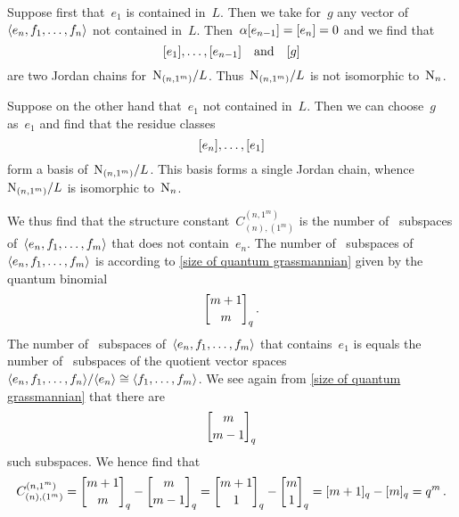 \documentclass[a4paper,11pt]{scrartcl}
\begin{document}
Suppose first that~$e_1$ is contained in~$L$.
Then we take for~$g$ any vector of~$\langle e_n, f_1, \dotsc, f_n\rangle$ not contained in~$L$.
Then~$\alpha [e_{n-1}] = [e_n] = 0$ and we find that
\[
  [e_1], \dotsc, [e_{n-1}]
  \quad
  \text{and}
  \quad
  [g]
\]
are two Jordan chains for~$\mathrm{N}_{(n, 1^m)} / L$.
Thus~$\mathrm{N}_{(n, 1^m)} / L$ is not isomorphic to~$\mathrm{N}_n$.

Suppose on the other hand that~$e_1$ not contained in~$L$.
Then we can choose~$g$ as~$e_1$ and find that the residue classes
\[
  [e_n], \dotsc, [e_1]
\]
form a basis of~$\mathrm{N}_{(n, 1^m)} / L$.
This basis forms a single Jordan chain, whence~$\mathrm{N}_{(n, 1^m)} / L$ is isomorphic to~$\mathrm{N}_n$.

We thus find that the structure constant~$C^{(n, 1^m)}_{(n), (1^m)}$ is the number of~ subspaces of~$\langle e_n, f_1, \dotsc, f_m\rangle$ that does not contain~$e_n$.
The number of~ subspaces of~$\langle e_n, f_1, \dotsc, f_m\rangle$ is according to \cref{size of quantum grassmannian} given by the quantum binomial
\[
  \qbinom{m+1}{m}_q \,.
\]
The number of~ subspaces of~$\langle e_n, f_1, \dotsc, f_m\rangle$ that contains~$e_1$ is equals the number of~ subspaces of the quotient vector spaces~$\langle e_n, f_1, \dotsc, f_n\rangle / \langle e_n\rangle \cong \langle f_1, \dotsc, f_m\rangle$.
We see again from \cref{size of quantum grassmannian} that there are
\[
  \qbinom{m}{m-1}_q
\]
such subspaces.
We hence find that
\[
  C^{(n, 1^m)}_{(n), (1^m)}
  =
  \qbinom{m+1}{m}_q - \qbinom{m}{m-1}_q
  =
  \qbinom{m+1}{1}_q - \qbinom{m}{1}_q
  =
  \qnum{m+1}_q - \qnum{m}_q
  =
  q^m \,.
\]


%
%
\end{document}
